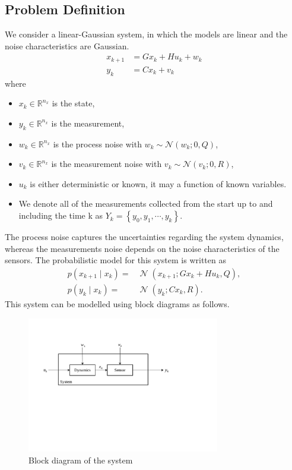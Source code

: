 \documentclass[twoside]{article}
\newcommand{\N}{\operatorname{\mathcal{N}}}
\renewcommand{\k}{_k{}}
\newcommand{\kp}{_{k+1}{}}
\begin{document}
\subsection*{Problem Definition}
We consider a linear-Gaussian system, in which the models are linear and the noise characteristics are Gaussian.
\begin{align*}
	x\kp &= G x\k + H u\k + w\k
	\\
	y\k &= C x\k + v\k
\end{align*}
where 
\begin{itemize}
	\item $x\k \in \mathbb{R}^{n_x}$ is the state,
	\item $y\k \in \mathbb{R}^{n_x}$ is the measurement,
	\item $w\k \in \mathbb{R}^{n_x}$ is the process noise with $w\k \sim \mathcal{N}(w\k;0,Q)$,
	\item $v\k \in \mathbb{R}^{n_x}$ is the measurement noise with $v\k \sim \mathcal{N}(v\k;0,R)$,
	\item $u\k$ is either deterministic or known, it may a function of known variables.
	
	\item We denote all of the measurements collected from the start up to  and including the time k as $Y\k = \left\lbrace y_0, y_1, \cdots,y_k \right\rbrace$.
\end{itemize}
The process noise captures the uncertainties regarding the system dynamics, whereas the measurements noise depends on the noise characteristics of the sensors. The probabilistic model for this system is written as
\begin{align*}
	p(x\kp\mid x\k) =& \N(x\kp;Gx\k+Hu\k,Q),\\
	p(y\k\mid x\k) =& \N(y\k;Cx\k,R).
\end{align*}
This system can be modelled using block diagrams as follows.
\begin{figure}[!h]
	\centering
	\includegraphics[trim={1cm 10cm 7cm 4cm},clip,width=0.75\textwidth]{figures/system}
	\caption{Block diagram of the system}
	\label{fig:system}
\end{figure}
\end{document}
